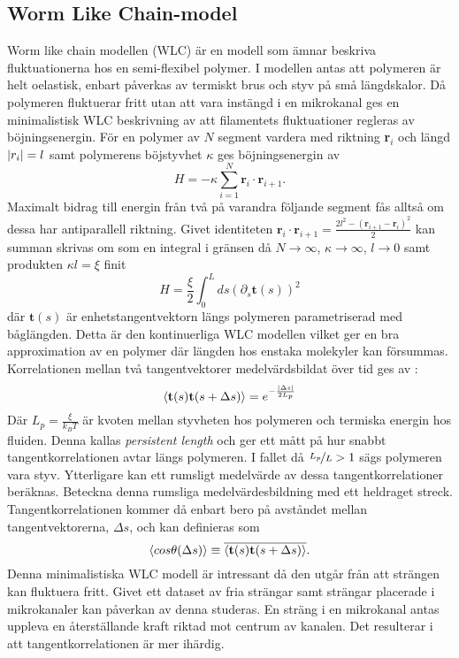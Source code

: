 \subsection{Worm Like Chain-model}
Worm like chain modellen \cite{Milstein2013} (WLC) är en modell som ämnar beskriva fluktuationerna hos en semi-flexibel polymer. I modellen antas att polymeren är helt oelastisk, enbart påverkas av termiskt brus och styv på små längdskalor. Då polymeren fluktuerar fritt utan att vara instängd i en mikrokanal ges en minimalistisk WLC beskrivning av att filamentets fluktuationer regleras av böjningsenergin. För en polymer av $N$ segment vardera med riktning \textbf{r}$_i$ och längd $\abs{r_{i}}=l$ samt polymerens böjstyvhet $\kappa$ ges böjningsenergin av 
\begin{equation}
    H = -\kappa\sum_{i=1}^{N}\textbf{r}_{i}\cdot \textbf{r}_{i+1}.
\end{equation}
Maximalt bidrag till energin från två på varandra följande segment fås alltså om dessa har antiparallell riktning. Givet identiteten $\textbf{r}_{i}\cdot\textbf{r}_{i+1}=\frac{2l^2-(\textbf{r}_{i+1}-\textbf{r}_{i})^2}{2}$ kan summan skrivas om som en integral i gränsen då $N \rightarrow \infty$, $\kappa\to\infty$, $l \rightarrow 0$ samt produkten $\kappa l=\xi$ finit 
\begin{equation}
    H=\frac{\xi}{2}\int_{0}^{L}ds(\partial_{s}\textbf{t}(s))^2
\end{equation}
där $\textbf{t}(s)$ är enhetstangentvektorn längs polymeren parametriserad med båglängden. Detta är den kontinuerliga WLC modellen \cite{Fixman_WLC1973} vilket ger en bra approximation av en polymer där längden hos enstaka molekyler kan försummas.  Korrelationen mellan två tangentvektorer medelvärdsbildat över tid ges av \cite{Landau1958}:
\begin{equation}
\ev{\textbf{t}(s)\textbf{t}(s+\Delta s)}=e^{-\frac{\abs{\Delta s}}{2L_{p}}}
\end{equation}
Där $L_{p}=\frac{\xi}{k_{B}T}$ är kvoten mellan styvheten hos polymeren och termiska energin hos fluiden. Denna kallas \emph{persistent length} och ger ett mått på hur snabbt tangentkorrelationen avtar längs polymeren. I fallet då $\nicefrac{L_{p}}{L}>1$ sägs polymeren vara styv. Ytterligare kan ett rumsligt medelvärde av dessa tangentkorrelationer beräknas. Beteckna denna rumsliga medelvärdesbildning med ett heldraget streck. Tangentkorrelationen kommer då enbart bero på avståndet mellan tangentvektorerna, $\Delta s$, och kan definieras som
\begin{equation}
\label{tangkorr}
    \ev{cos\theta(\Delta s)}\equiv\overline{\ev{\mathbf{t}(s)\mathbf{t}(s+\Delta s)}}.
\end{equation}
Denna minimalistiska WLC modell är intressant då den utgår från att strängen kan fluktuera fritt. Givet ett dataset av fria strängar samt strängar placerade i mikrokanaler kan påverkan av denna studeras. En sträng i en mikrokanal antas uppleva en återställande kraft riktad mot centrum av kanalen. Det resulterar i att tangentkorrelationen är mer ihärdig.

